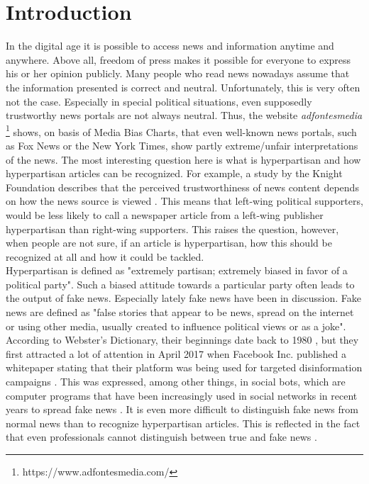 \documentclass[a4paper, 11pt,titlepage,oneside,openany]{book}
\begin{document}

\newpage



\chapter{Introduction}
In the digital age it is possible to access news and information anytime and anywhere. Above all, freedom of press makes it possible for everyone to express his or her opinion publicly. Many people who read news nowadays assume that the information presented is correct and neutral. Unfortunately, this is very often not the case. Especially in special political situations, even supposedly trustworthy news portals are not always neutral.  Thus, the website \textit{adfontesmedia} \footnote{https://www.adfontesmedia.com/} shows, on basis of Media Bias Charts, that even well-known news portals, such as Fox News or the New York Times, show partly extreme/unfair interpretations of the news. The most interesting question here is what is hyperpartisan and how hyperpartisan articles can be recognized. For example, a study by the Knight Foundation describes that the perceived trustworthiness of news content depends on how the news source is viewed \cite{study}. This means that left-wing political supporters, would be less likely to call a newspaper article from a left-wing publisher hyperpartisan than right-wing supporters. This raises the question, however, when people are not sure, if an article is hyperpartisan, how this should be recognized at all and how it could be tackled.  \\
\indent Hyperpartisan is defined as "extremely partisan; extremely biased in favor of a political party". Such a biased attitude towards a particular party often leads to the output of fake news. Especially lately fake news have been in discussion. Fake news are defined as "false stories that appear to be news, spread on the internet or using other media, usually created to influence political views or as a joke". According to Webster's Dictionary, their beginnings date back to 1980 \cite{webster}, but they first attracted a lot of attention in April 2017 when Facebook Inc. published a whitepaper stating that their platform was being used for targeted disinformation campaigns \cite{facebook}. This was expressed, among other things, in social bots, which are computer programs that have been increasingly used in social networks in recent years to spread fake news \cite{socialbots}. It is even more difficult to distinguish fake news from normal news than to recognize hyperpartisan articles. This is reflected in the fact that even professionals cannot distinguish between true and fake news \cite{notsure}. 
\end{document}
